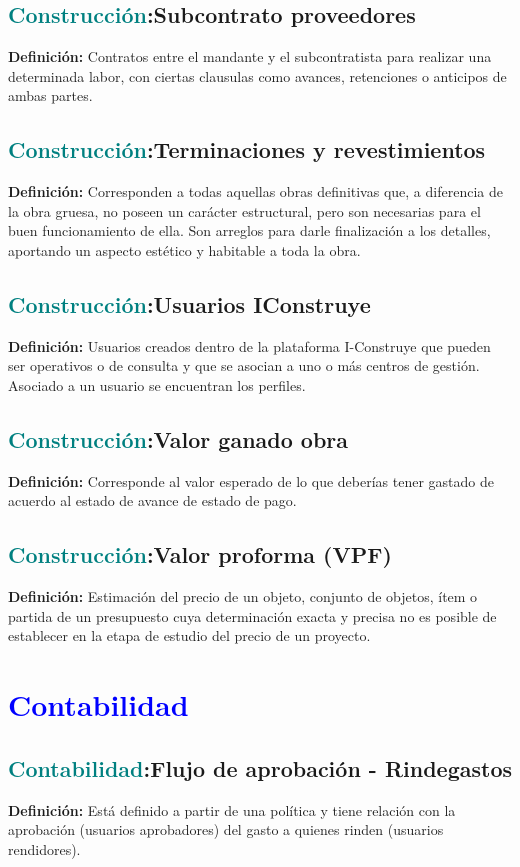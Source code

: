 \documentclass[12pt]{article}
\begin{document}
\subsection{\textcolor{teal}{Construcción}:{Subcontrato proveedores}}
\textbf{Definición:} Contratos entre el mandante y el subcontratista para realizar una determinada labor, con ciertas clausulas como avances, retenciones o anticipos de ambas partes.
\subsection{\textcolor{teal}{Construcción}:{Terminaciones y revestimientos}}
\textbf{Definición:} Corresponden a todas aquellas obras definitivas que, a diferencia de la obra gruesa, no poseen un carácter estructural, pero son necesarias para el buen funcionamiento de ella. Son arreglos para darle finalización a los detalles, aportando un aspecto estético y habitable a toda la obra.
\subsection{\textcolor{teal}{Construcción}:{Usuarios IConstruye}}
\textbf{Definición:} Usuarios creados dentro de la plataforma I-Construye que pueden ser operativos o de consulta y que se asocian a uno o más centros de gestión. Asociado a un usuario se encuentran los perfiles.
\subsection{\textcolor{teal}{Construcción}:{Valor ganado obra}}
\textbf{Definición:} Corresponde al valor esperado de lo que deberías tener gastado de acuerdo al estado de avance de estado de pago.
\subsection{\textcolor{teal}{Construcción}:{Valor proforma (VPF)}}
\textbf{Definición:} Estimación del precio de un objeto, conjunto de objetos, ítem o partida de un presupuesto cuya determinación exacta y precisa no es posible de establecer en la etapa de estudio del precio de un proyecto.
\section{\textcolor{blue}{Contabilidad}}
\subsection{\textcolor{teal}{Contabilidad}:{Flujo de aprobación - Rindegastos}}
\textbf{Definición:} Está definido a partir de una política y tiene relación con la aprobación (usuarios aprobadores) del gasto a quienes rinden (usuarios rendidores).
\end{document}
